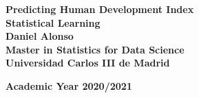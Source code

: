 \documentclass[a4paper,12pt]{article}
\begin{document}
	
		\begin{titlepage}
		\begin{center}
		\textbf{\LARGE Predicting Human Development Index}\\[0.65 cm]
		\textbf{\LARGE Statistical Learning}\\[5 cm]
		
        \textbf{\large Daniel Alonso}\\[0.8cm]
        \textbf{\large Master in Statistics for Data Science}\\[0.3 cm]
        \textbf{\large Universidad Carlos III de Madrid}\\[1.5 cm]
        \begin{figure}[H]
		    \centering
		\end{figure}
		\textbf{Academic Year 2020/2021}    
		\end{center}
	    \end{titlepage} 
\end{document}
